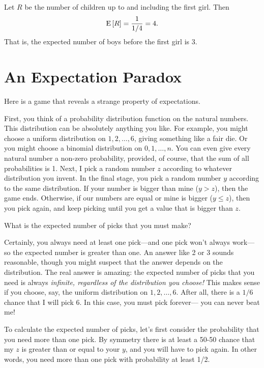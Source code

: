 \documentclass[11pt,twoside]{article}
\begin{document}
Let $R$ be the number of children up to and including the first girl.
Then\[ \mathop{\textup{E}}\nolimits\left[R\right] = \frac{1}{1/4} = 4. \]
That is, the expected number of boys before the first girl is $3$.

\section{An Expectation Paradox}

Here is a game that reveals a strange property of expectations.

First, you think of a probability distribution function on the natural
numbers.  This distribution can be absolutely anything you like.  For
example, you might choose a uniform distribution on $1, 2, \ldots, 6$,
giving something like a fair die.  Or you might choose a binomial
distribution on $0, 1, \ldots, n$.  You can even give every natural number
a non-zero probability, provided, of course, that the sum of all
probabilities is 1.  Next, I pick a random number $z$ according to
whatever distribution you invent.  In the final stage, you pick a random
number $y$ according to the same distribution.  If your number is bigger
than mine ($y > z$), then the game ends.  Otherwise, if our numbers are
equal or mine is bigger ($y \leq z$), then you pick again, and keep
picking until you get a value that is bigger than $z$.

What is the expected number of picks that you must make?

Certainly, you always need at least one pick---and one pick won't always
work---so the expected number is greater than one.  An answer like 2 or 3
sounds reasonable, though you might suspect that the answer depends on the
distribution.  The real answer is amazing: the expected number of picks
that you need is always \emph{infinite, regardless of the distribution you
choose!}  This makes sense if you choose, say, the uniform distribution on
$1, 2, \ldots, 6$.  After all, there is a $1/6$ chance that I will pick 6.
In this case, you must pick forever--- you can never beat me!

To calculate the expected number of picks, let's first consider the
probability that you need more than one pick.  By symmetry there is at
least a 50-50 chance that my $z$ is greater than or equal to your $y$, and
you will have to pick again.  In other words, you need more than one pick
with probability at least 1/2.
\end{document}
